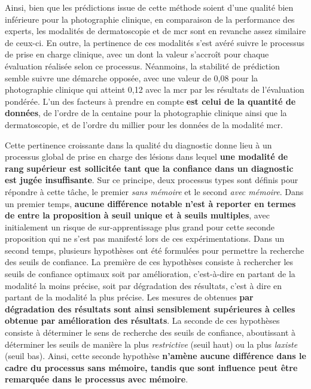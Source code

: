 Ainsi, bien que les prédictions issue de cette méthode soient d'une qualité bien inférieure pour la photographie clinique, en comparaison de la performance des experts, les modalités de dermatoscopie et de \gls{mcr} sont en revanche assez similaire de ceux-ci. En outre, la pertinence de ces modalités s'est avéré suivre le processus de prise en charge clinique, avec un \fscore{} dont la valeur s'accroît pour chaque évaluation réalisée selon ce processus. Néanmoins, la stabilité de prédiction semble suivre une démarche opposée, avec une valeur de 0,08 pour la photographie clinique qui atteint 0,12 avec la \gls{mcr} par les résultats de l'évaluation pondérée. L'un des facteurs à prendre en compte \textbf{est celui de la quantité de données}, de l'ordre de la centaine pour la photographie clinique ainsi que la dermatoscopie, et de l'ordre du millier pour les données de la modalité \gls{mcr}.\par

Cette pertinence croissante dans la qualité du diagnostic donne lieu à un processus global de prise en charge des lésions dans lequel \textbf{une modalité de rang supérieur est sollicitée tant que la confiance dans un diagnostic est jugée insuffisante}. Sur ce principe, deux processus types sont définis pour répondre à cette tâche, le premier \textit{sans mémoire} et le second \textit{avec mémoire}. Dans un premier temps, \textbf{aucune différence notable n'est à reporter en termes de \fscore{} entre la proposition à seuil unique et à seuils multiples}, avec initialement un risque de sur-apprentissage plus grand pour cette seconde proposition qui ne s'est pas manifesté lors de ces expérimentations. Dans un second temps, plusieurs hypothèses ont été formulées pour permettre la recherche des seuils de confiance. La première de ces hypothèses consiste à rechercher les seuils de confiance optimaux soit par amélioration, c'est-à-dire en partant de la modalité la moins précise, soit par dégradation des résultats, c'est à dire en partant de la modalité la plus précise. Les mesures de \fscore{} obtenues \textbf{par dégradation des résultats sont ainsi sensiblement supérieures à celles obtenue par amélioration des résultats}. La seconde de ces hypothèses consiste à déterminer le sens de recherche des seuils de confiance, aboutissant à déterminer les seuils de manière la plus \textit{restrictive} (seuil haut) ou la plus \textit{laxiste} (seuil bas). Ainsi, cette seconde hypothèse \textbf{n'amène aucune différence dans le cadre du processus sans mémoire, tandis que sont influence peut être remarquée dans le processus avec mémoire}.\par
\clearpage

